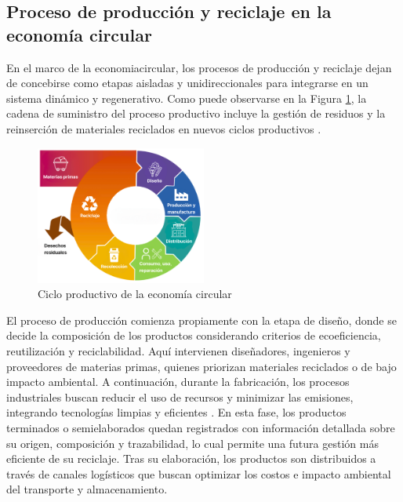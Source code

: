 \subsection{Proceso de producción y reciclaje en la economía circular}

En el marco de la \gls{economiacircular}, los procesos de producción y reciclaje dejan de concebirse como etapas aisladas y unidireccionales para integrarse en un sistema dinámico y regenerativo. Como puede observarse en la Figura \ref{fig:circular-economy-stages}, la cadena de suministro del proceso productivo incluye la gestión de residuos y la reinserción de materiales reciclados en nuevos ciclos productivos \cite{cepal2021economia}.

\begin{figure}[!b]
    \centering
    \includegraphics[width=0.5\textwidth]{Figures/circular-economy-stages.png}
    \caption{Ciclo productivo de la economía circular}
    \label{fig:circular-economy-stages}
\end{figure}

El proceso de producción comienza propiamente con la etapa de diseño, donde se decide la composición de los productos considerando criterios de ecoeficiencia, reutilización y reciclabilidad. Aquí intervienen diseñadores, ingenieros y proveedores de materias primas, quienes priorizan materiales reciclados o de bajo impacto ambiental. A continuación, durante la fabricación, los procesos industriales buscan reducir el uso de recursos y minimizar las emisiones, integrando tecnologías limpias y eficientes \cite{espanacircular2030}. En esta fase, los productos terminados o semielaborados quedan registrados con información detallada sobre su origen, composición y trazabilidad, lo cual permite una futura gestión más eficiente de su reciclaje. Tras su elaboración, los productos son distribuidos a través de canales logísticos que buscan optimizar los costos e impacto ambiental del transporte y almacenamiento.

